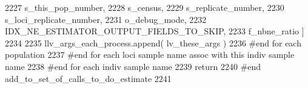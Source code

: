 \begin{DoxyCode}
2227                                     s\_this\_pop\_number, 
2228                                     s\_census,
2229                                     s\_replicate\_number, 
2230                                     s\_loci\_replicate\_number,
2231                                     o\_debug\_mode,
2232                                     IDX\_NE\_ESTIMATOR\_OUTPUT\_FIELDS\_TO\_SKIP,
2233                                     f\_nbne\_ratio ]
2234 
2235                 llv\_args\_each\_process.append( lv\_these\_args )
2236             \textcolor{comment}{#end for each population}
2237         \textcolor{comment}{#end for each loci sample name assoc with this indiv sample name}
2238     \textcolor{comment}{#end for each indiv sample name}
2239     \textcolor{keywordflow}{return}
2240 \textcolor{comment}{#end add\_to\_set\_of\_calls\_to\_do\_estimate}
2241 
\end{DoxyCode}
